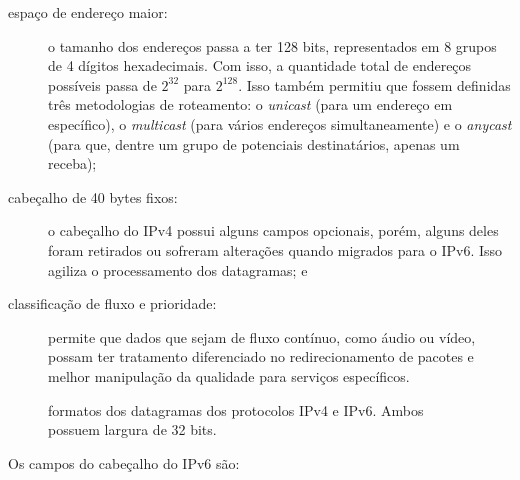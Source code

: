 \begin{description}
    \item[espaço de endereço maior:] o tamanho dos endereços passa a ter 128 bits,
        representados em 8 grupos de 4 dígitos hexadecimais. Com isso, a quantidade
        total de endereços possíveis passa de $2^{32}$ para $2^{128}$. Isso também
        permitiu que fossem definidas três metodologias de roteamento: o \emph{unicast}
        (para um endereço em específico), o \emph{multicast} (para vários endereços
        simultaneamente) e o \emph{anycast} (para que, dentre um grupo de potenciais
        destinatários, apenas um receba);

    \item[cabeçalho de 40 bytes fixos:] o cabeçalho do IPv4 possui alguns campos
        opcionais, porém, alguns deles foram retirados ou sofreram alterações quando
        migrados para o IPv6. Isso agiliza o processamento dos datagramas; e

    \newpage
    \item[classificação de fluxo e prioridade:] permite que dados que sejam de fluxo
        contínuo, como áudio ou vídeo, possam ter tratamento diferenciado no
        redirecionamento de pacotes e melhor manipulação da qualidade para serviços
        específicos.
\end{description}

\begin{figure}[H]
    \centering
    \caption{formatos dos datagramas dos protocolos IPv4 e IPv6. Ambos possuem largura de 32 bits.}
    \label{fig:headers}
\end{figure}

Os campos do cabeçalho do IPv6 são:

